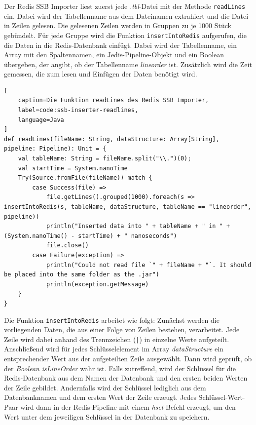 Der Redis SSB Importer liest zuerst jede \emph{.tbl}-Datei mit der Methode \lstinline|readLines| ein. Dabei wird der Tabellenname aus dem Dateinamen extrahiert und die Datei in Zeilen gelesen. Die gelesenen Zeilen werden in Gruppen zu je 1000 Stück gebündelt. Für jede Gruppe wird die Funktion \lstinline|insertIntoRedis| aufgerufen, die die Daten in die Redis-Datenbank einfügt. Dabei wird der Tabellenname, ein Array mit den Spaltennamen, ein Jedis-Pipeline-Objekt und ein Boolean übergeben, der angibt, ob der Tabellenname \emph{lineorder} ist.
Zusätzlich wird die Zeit gemessen, die zum lesen und Einfügen der Daten benötigt wird.

\begin{lstlisting}[
    caption=Die Funktion readLines des Redis SSB Importer,
    label=code:ssb-inserter-readlines,
    language=Java
]
def readLines(fileName: String, dataStructure: Array[String], pipeline: Pipeline): Unit = {
	val tableName: String = fileName.split("\\.")(0);
	val startTime = System.nanoTime
	Try(Source.fromFile(fileName)) match {
		case Success(file) =>
			file.getLines().grouped(1000).foreach(s => insertIntoRedis(s, tableName, dataStructure, tableName == "lineorder", pipeline))
			println("Inserted data into " + tableName + " in " + (System.nanoTime() - startTime) + " nanoseconds")
			file.close()
		case Failure(exception) =>
			println("Could not read file `" + fileName + "`. It should be placed into the same folder as the .jar")
			println(exception.getMessage)
	}
}
\end{lstlisting}

Die Funktion \lstinline|insertIntoRedis| arbeitet wie folgt: Zunächst werden die vorliegenden Daten, die aus einer Folge von Zeilen bestehen, verarbeitet. Jede Zeile wird dabei anhand des Trennzeichen (\lstinline+|+) in einzelne Werte aufgeteilt. Anschließend wird für jedes Schlüsselelement im Array \emph{dataStructure} ein entsprechender Wert aus der aufgeteilten Zeile ausgewählt. Dann wird geprüft, ob der \emph{Boolean} \emph{isLineOrder} wahr ist. Falls zutreffend, wird der Schlüssel für die Redis-Datenbank aus dem Namen der Datenbank und den ersten beiden Werten der Zeile gebildet. Andernfalls wird der Schlüssel lediglich aus dem Datenbanknamen und dem ersten Wert der Zeile erzeugt. Jedes Schlüssel-Wert-Paar wird dann in der Redis-Pipeline mit einem \emph{hset}-Befehl erzeugt, um den Wert unter dem jeweiligen Schlüssel in der Datenbank zu speichern.

